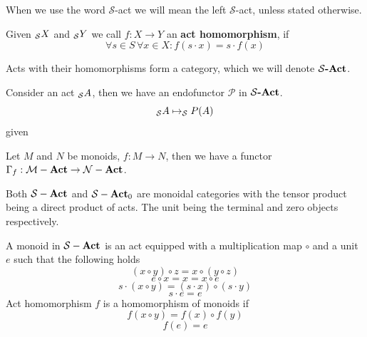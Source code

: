    \begin{remark}
        When we use the word $\mathcal{S}$-act we will mean the left $\mathcal{S}$-act, unless 
        stated otherwise.
    \end{remark}
    \begin{definition}
        Given $_{\mathcal{S}}X$ and $_{\mathcal{S}}Y$ we call $f: X \to Y$ an
        \textbf{act homomorphism}, if 
        \[
            \forall s\in S\,\forall x \in X : f(s\cdot x) = s\cdot f(x)
        \]
    \end{definition}
    \begin{proposition}
        Acts with their homomorphisms form a category, which we will denote $\mathrm{\textbf{$\mathcal{S}$-Act}}$.
    \end{proposition}
    \begin{construction}
        Consider an act $_{\mathcal{S}}A$, then we have an endofunctor
        $\mathcal{P}$ in $\mathrm{\textbf{$\mathcal{S}$-Act}}$. 
        \[_{\mathcal{S}}A \mapsto _{\mathcal{S}}P(A)\]
        given 
    \end{construction}
    \begin{definition}
        Let $M$ and $N$ be monoids, $f: M \to N$, then we have a functor $\Gamma_f : \mathcal{M}-\mathrm{\textbf{Act}} \to \mathcal{N}-\mathrm{\textbf{Act}}$.
    \end{definition}

    Both $\mathcal{S}-\mathrm{\textbf{Act}}$ and $\mathcal{S}-\mathrm{\textbf{Act}}_0$ are monoidal categories 
    with the tensor product being a direct product of acts. 
    The unit being the terminal and zero objects respectively.\par 
        A monoid in $\mathcal{S}-\mathrm{\textbf{Act}}$ is an act equipped with 
        a multiplication map $\circ$ and a unit $e$ such that
        the following holds
        \[
            (x\circ y)\circ z = x\circ (y\circ z)
        \]
        \[
            e \circ x = x = x \circ e
        \]
        \[
            s\cdot (x\circ y) = (s\cdot x) \circ (s\cdot y)
        \]
        \[
            s\cdot e = e
        \]
        Act homomorphism $f$ is a homomorphism of monoids if
        \[
            f(x\circ y) = f(x)\circ f(y)
        \]
        \[
            f(e) = e
        \]
